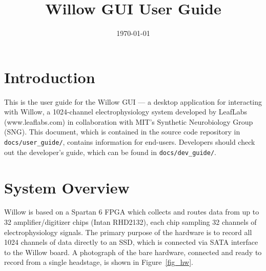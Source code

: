 % 


\usepackage{bm}

\title{Willow GUI User Guide}
\date{\today}


\maketitle


\section{Introduction}
\label{sec_intro}

This is the user guide for the Willow GUI --- a desktop application for interacting with Willow, a 1024-channel electrophysiology system developed by LeafLabs (www.leaflabs.com) in collaboration with MIT's Synthetic Neurobiology Group (SNG). This document, which is contained in the source code repository in \texttt{docs/user\_guide/}, contains information for end-users. Developers should check out the developer's guide, which can be found in \texttt{docs/dev\_guide/}.


\section{System Overview}
\label{sec_overview}

Willow is based on a Spartan 6 FPGA which collects and routes data from up to 32 amplifier/digitizer chips (Intan RHD2132), each chip sampling 32 channels of electrophysiology signals. The primary purpose of the hardware is to record all 1024 channels of data directly to an SSD, which is connected via SATA interface to the Willow board. A photograph of the bare hardware, connected and ready to record from a single headstage, is shown in Figure~\ref{fig_hw}.

